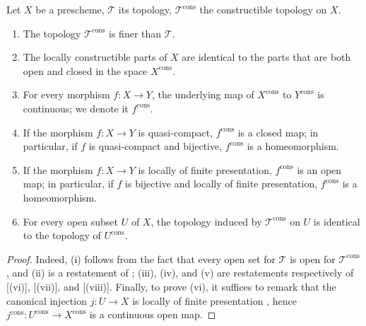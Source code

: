\begin{proposition}[1.9.14]
\label{IV.1.9.14}
Let $X$ be a prescheme, $\mathscr{T}$ its topology, $\mathscr{T}^{\mathrm{cons}}$ the constructible topology on $X$.
\begin{enumerate}
  \item[\rm(i)] The topology $\mathscr{T}^{\mathrm{cons}}$ is finer than $\mathscr{T}$.
  \item[\rm(ii)] The locally constructible parts of $X$ are identical to the parts that are both open and closed in the space $X^{\mathrm{cons}}$.
  \item[\rm(iii)] For every morphism $f:X\to Y$, the underlying map of $X^{\mathrm{cons}}$ to $Y^{\mathrm{cons}}$ is continuous; we denote it $f^{\mathrm{cons}}$.
  \item[\rm(iv)] If the morphism $f:X\to Y$ is quasi-compact, $f^{\mathrm{cons}}$ is a closed map; in particular, if $f$ is quasi-compact and bijective, $f^{\mathrm{cons}}$ is a homeomorphism.
  \item[\rm(v)] If the morphism $f:X\to Y$ is locally of finite presentation, $f^{\mathrm{cons}}$ is an open map; in particular, if $f$ is bijective and locally of finite presentation, $f^{\mathrm{cons}}$ is a homeomorphism.
  \item[\rm(vi)] For every open subset $U$ of $X$, the topology induced by $\mathscr{T}^{\mathrm{cons}}$ on $U$ is identical to the topology of $U^{\mathrm{cons}}$.
\end{enumerate}
\end{proposition}

\begin{proof}
Indeed, (i) follows from the fact that every open set for $\mathscr{T}$ is open for $\mathscr{T}^{\mathrm{cons}}$ , and (ii) is a restatement of ; (iii), (iv), and (v) are restatements respectively of [(vi)], [(vii)], and [(viii)].
Finally, to prove (vi), it suffices to remark that the canonical injection $j:U\to X$ is locally of finite presentation , hence $j^{\mathrm{cons}}:U^{\mathrm{cons}}\to X^{\mathrm{cons}}$ is a continuous open map.
\end{proof}

